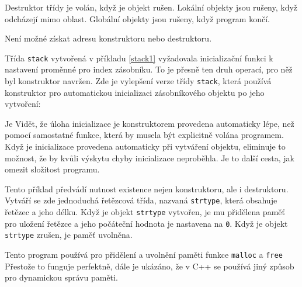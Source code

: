     Destruktor třídy je volán, když je objekt rušen. Lokální objekty jsou rušeny, když odcházejí mimo oblast. Globální objekty jsou rušeny, když
    program končí.

    Není možné získat adresu konstruktoru nebo destruktoru.
    \begin{example}
      Třída \lstinline[basicstyle=\ttfamily]!stack! vytvořená v příkladu \ref{stack1} vyžadovala inicializační funkci k nastavení proměnné pro index zásobníku. To je přesně ten druh operací, pro něž byl konstruktor navržen. Zde je vylepšení verze třídy \lstinline[basicstyle=\ttfamily]!stack!, která používá konstruktor pro automatickou inicializaci zásobníkového objektu po jeho vytvoření:
      
      Je Vidět, že úloha inicializace je konstruktorem provedena automaticky lépe, než pomocí samostatné funkce, která by musela být explicitně volána programem. Když je inicializace provedena automaticky při vytváření objektu, eliminuje to možnost, že by kvůli výskytu chyby inicializace neproběhla. Je to další cesta, jak omezit složitost programu.
    \end{example}
    \begin{example}
      Tento příklad předvádí nutnost existence nejen konstruktoru, ale i destruktoru. Vytváří se zde jednoduchá řetězcová třída, nazvaná \lstinline[basicstyle=\ttfamily]!strtype!, která obsahuje řetězec a jeho délku. Když je objekt \lstinline[basicstyle=\ttfamily]!strtype! vytvořen, je mu přidělena paměť pro uložení řetězce a jeho počáteční hodnota je nastavena na \lstinline[basicstyle=\ttfamily]!0!. Když je objekt \lstinline[basicstyle=\ttfamily]!strtype! zrušen, je paměť uvolněna.
      
    \end{example}
    Tento program používá pro přidělení a uvolnění paměti funkce \lstinline[basicstyle=\ttfamily]!malloc! a \lstinline[basicstyle=\ttfamily]!free! Přestože to funguje perfektně, dále je ukázáno, že v C++ se používá jiný způsob pro dynamickou správu paměti.   